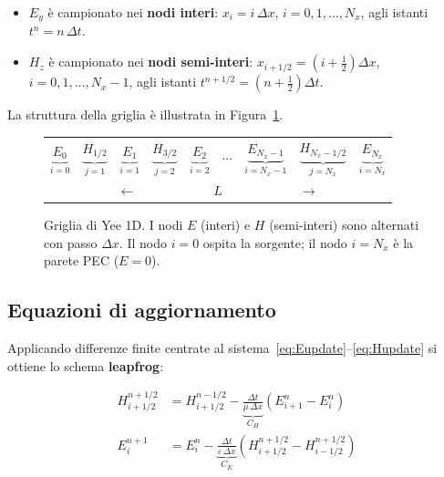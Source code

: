 \documentclass[a4paper, 11pt]{article}
\newcommand{\eps}{\varepsilon}
\newcommand{\muu}{\mu}
\newcommand{\Efield}{E_y}
\newcommand{\Hfield}{H_z}
\newcommand{\dx}{\Delta x}
\newcommand{\dt}{\Delta t}
\newcommand{\En}[2]{E_{#1}^{#2}}
\newcommand{\Hn}[2]{H_{#1}^{#2}}
\begin{document}
\begin{itemize}
    \item $\Efield$ è campionato nei \textbf{nodi interi}: $x_i = i\,\dx$,
          $i = 0, 1, \ldots, N_x$, agli istanti $t^n = n\,\dt$.
    \item $\Hfield$ è campionato nei \textbf{nodi semi-interi}: $x_{i+1/2} = (i+\tfrac{1}{2})\dx$,
          $i = 0, 1, \ldots, N_x-1$, agli istanti $t^{n+1/2} = (n+\tfrac{1}{2})\dt$.
\end{itemize}

La struttura della griglia è illustrata in Figura~\ref{fig:yee_grid}.

\begin{figure}[H]
\centering
\begin{tikzpicture}[scale=1.0, font=\small]
\end{tikzpicture}
\begin{center}
\ttfamily\small
\begin{tabular}{ccccccccc}
$\underbrace{E_0}_{i=0}$ & $\underbrace{H_{1/2}}_{j=1}$ &
$\underbrace{E_1}_{i=1}$ & $\underbrace{H_{3/2}}_{j=2}$ &
$\underbrace{E_2}_{i=2}$ & $\cdots$ &
$\underbrace{E_{N_x-1}}_{i=N_x-1}$ & $\underbrace{H_{N_x-1/2}}_{j=N_x}$ &
$\underbrace{E_{N_x}}_{i=N_x}$\\[4pt]
\multicolumn{9}{c}{$\longleftarrow\qquad\qquad\qquad L \qquad\qquad\qquad\longrightarrow$}
\end{tabular}
\end{center}
\caption{Griglia di Yee 1D. I nodi $E$ (interi) e $H$ (semi-interi) sono alternati con
passo $\dx$. Il nodo $i=0$ ospita la sorgente; il nodo $i=N_x$ è la parete PEC ($E=0$).}
\label{fig:yee_grid}
\end{figure}

\subsection{Equazioni di aggiornamento}

Applicando differenze finite centrate al sistema~\eqref{eq:Eupdate}--\eqref{eq:Hupdate}
si ottiene lo schema \textbf{leapfrog}:

\begin{tcolorbox}[colback=blue!5, colframe=blue!50!black,
    title={Schema leapfrog di Yee 1D (mezzo omogeneo)}, fonttitle=\bfseries]
\begin{align}
    \Hn{i+1/2}{n+1/2} &= \Hn{i+1/2}{n-1/2}
        - \underbrace{\frac{\dt}{\muu\,\dx}}_{C_H}
          \!\left(\En{i+1}{n} - \En{i}{n}\right)
    \label{eq:Hleap}\\[8pt]
    \En{i}{n+1} &= \En{i}{n}
        - \underbrace{\frac{\dt}{\eps\,\dx}}_{C_E}
          \!\left(\Hn{i+1/2}{n+1/2} - \Hn{i-1/2}{n+1/2}\right)
    \label{eq:Eleap}
\end{align}
\end{tcolorbox}
\end{document}
